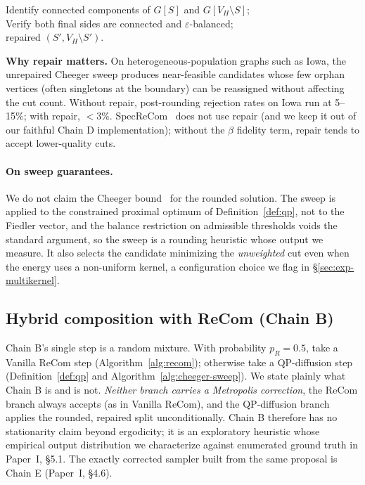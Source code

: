 \documentclass[11pt]{article}
\begin{document}
\begin{algorithm}[H]
\caption{Orphan-flip repair}\label{alg:orphan-flip}
Identify connected components of $G[S]$ and $G[V_H \setminus S]$;\\
Verify both final sides are connected and $\varepsilon$-balanced;\\
\Return repaired $(S', V_H \setminus S')$.
\end{algorithm}

\textbf{Why repair matters.} On heterogeneous-population graphs such
as Iowa, the unrepaired Cheeger sweep produces near-feasible
candidates whose few orphan vertices (often singletons at the
boundary) can be reassigned without affecting the cut count.
Without repair, post-rounding rejection rates on Iowa run at 5--15\%;
with repair, $<3\%$. SpecReCom~\cite{davies2025spectral} does not use
repair (and we keep it out of our faithful Chain D
implementation); without the $\beta$ fidelity term, repair tends to
accept lower-quality cuts.

\paragraph{On sweep guarantees.} We do not claim the Cheeger
bound~\cite{chung1997spectral} for the rounded solution. The sweep is
applied to the constrained proximal optimum of
Definition~\ref{def:qp}, not to the Fiedler vector, and the balance
restriction on admissible thresholds voids the standard argument, so
the sweep is a rounding heuristic whose output we measure. It also
selects the candidate minimizing the \emph{unweighted} cut even when
the energy uses a non-uniform kernel, a configuration choice we flag
in \S\ref{sec:exp-multikernel}.

\subsection{Hybrid composition with ReCom (Chain B)}\label{sec:hybrid-mh}

Chain B's single step is a random mixture. With probability
$p_R = 0.5$, take a Vanilla ReCom step (Algorithm~\ref{alg:recom});
otherwise take a QP-diffusion step (Definition~\ref{def:qp} and
Algorithm~\ref{alg:cheeger-sweep}). We state plainly what Chain B is
and is not. \emph{Neither branch carries a Metropolis correction}, the ReCom branch always accepts (as in Vanilla ReCom), and the
QP-diffusion branch applies the rounded, repaired split
unconditionally. Chain B therefore has no stationarity claim beyond
ergodicity; it is an exploratory heuristic whose empirical output
distribution we characterize against enumerated ground truth in
Paper~I, \S5.1. The exactly corrected sampler built from the same
proposal is Chain E (Paper~I, \S4.6).
\end{document}
